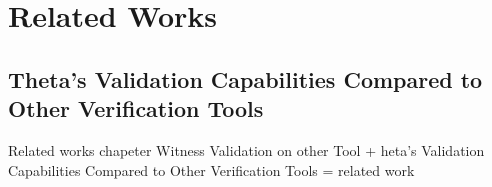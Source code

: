 \chapter{Related Works}
\section{Theta's Validation Capabilities Compared to Other Verification Tools}


Related works chapeter Witness Validation on other Tool + heta’s Validation Capabilities 
Compared to Other Verification Tools = related work


